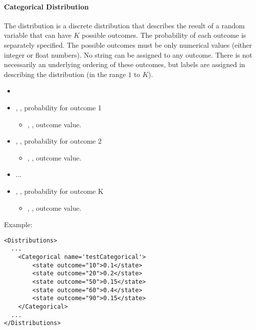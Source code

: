 \paragraph{Categorical Distribution}
\label{Categorical}
The  distribution is a discrete distribution that describes the result of a random variable that can have $K$ possible outcomes. 
The probability of each outcome is separately specified.
The possible outcomes must be only numerical values (either integer or float numbers). No string can be assigned to any outcome.
%
There is not necessarily an underlying ordering of these outcomes, but labels are assigned in describing the distribution (in the range $1$ to $K$).
%
%
\attrIntro
\vspace{-5mm}
\begin{itemize}
  \itemsep0em
  \item \nameDescription
\end{itemize}
\vspace{-5mm}
\subnodeIntro
\begin{itemize}
  \item {}, , probability for outcome 1
  \begin{itemize}
          \item {}, , outcome value.
  \end{itemize}
  \item {}, , probability for outcome 2
  \begin{itemize}
          \item {}, , outcome value.
  \end{itemize}
  \item ...
  \item {}, , probability for outcome K
  \begin{itemize}
          \item {}, , outcome value.
  \end{itemize}
 \end{itemize}
Example:
\begin{lstlisting}[style=XML]
<Distributions>
  ...
    <Categorical name='testCategorical'>
        <state outcome="10">0.1</state>
        <state outcome="20">0.2</state>
        <state outcome="50">0.15</state>
        <state outcome="60">0.4</state>
        <state outcome="90">0.15</state>
    </Categorical>
  ...
</Distributions>
\end{lstlisting}


